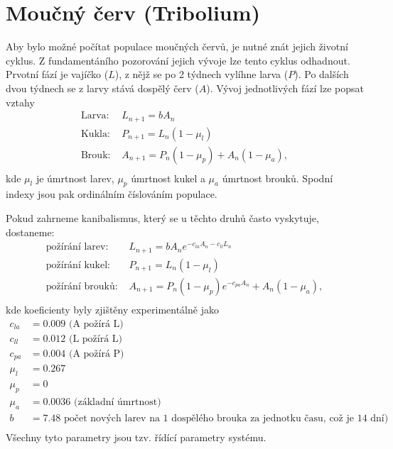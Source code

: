 \documentclass[a4paper, 12pt]{article}
\begin{document}
\section{Moučný červ (Tribolium)}
Aby bylo možné počítat populace moučných červů, je nutné znát jejich životní cyklus. Z fundamentáního pozorování jejich vývoje lze tento cyklus odhadnout. Prvotní fází je vajíčko ($L$), z nějž se po 2 týdnech vylíhne larva ($P$). Po dalších dvou týdnech se z larvy stává dospělý červ ($A$). Vývoj jednotlivých fází lze popsat vztahy\\
\begin{equation}
    \begin{split}
\text{Larva: }& L_{n+1}=b A_n \\
\text{Kukla: }& P_{n+1}=L_n(1-\mu_l) \\
\text{Brouk: }& A_{n+1}=P_n(1-\mu_p)+A_n(1-\mu_a), \\
    \end{split}
\end{equation}
kde $\mu_l$ je úmrtnost larev, $\mu_p$ úmrtnost kukel a $\mu_a$ úmrtnost brouků. Spodní indexy jsou pak ordinálním číslováním populace.


Pokud zahrneme kanibalismus, který se u těchto druhů často vyskytuje, dostaneme: \\
\begin{equation}
\label{eq:vyvoj}
\begin{split}
\text{požírání larev: }&L_{n+1}=b A_n e^{-c_{la}A_n-c_{ll} L_n} \\
\text{požírání kukel: }&P_{n+1}=L_n(1-\mu_l) \\
\text{požírání brouků: }& A_{n+1}=P_n(1-\mu_p)e^{-c_{pa} A_n}+A_n(1-\mu_a), \\
\end{split}
\end{equation}
kde koeficienty byly zjištěny experimentálně jako
\begin{equation}
\begin{split}
c_{la}& = 0.009 \text{ (A požírá L)}\\
c_{ll}& = 0.012 \text{ (L požírá L)}\\
c_{pa}& = 0.004 \text{ (A požírá P)}\\
\mu_l& = 0.267 \\
\mu_p& = 0\\
\mu_a& = 0.0036 \text{ (základní úmrtnost)} \\
b& =7.48 \text{ počet nových larev na 1 dospělého brouka za jednotku času, což je 14 dní)}\\
\end{split}
\end{equation}
Všechny tyto parametry jsou tzv. řídící parametry systému.
\end{document}
